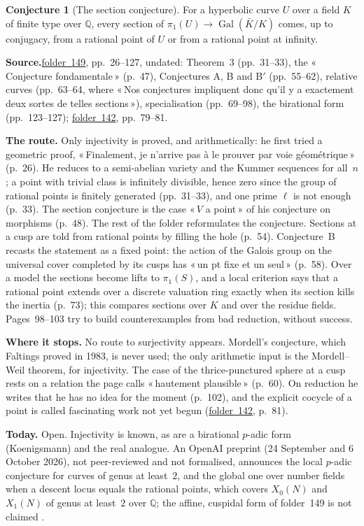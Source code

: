 \documentclass[11pt]{article}
\newcommand{\q}[1]{«\,#1\,»}
\newcommand{\fac}[1]{\href{https://grothendieck.umontpellier.fr/#1.pdf}{folder~#1}}
\newcommand{\Gal}{\operatorname{Gal}}
\theoremstyle{definition}
\theoremstyle{plain}\newtheorem*{proposition}{Proposition}\theoremstyle{definition}
\newtheorem{bigconj}{Conjecture}
\newcommand{\entry}[1]{\par\medskip\noindent\textbf{#1}\enspace}
\newcommand{\src}[1]{\entry{Source.}#1}
\begin{document}
\begin{bigconj}[The section conjecture]\label{c:sec}
For a hyperbolic curve $U$ over a field $K$ of finite type over $\mathbb Q$, every section of $\pi_1(U) \to \Gal(\bar K/K)$ comes, up to conjugacy, from a rational point of $U$ or from a rational point at infinity.
\end{bigconj}

\src{\fac{149}, pp.~26--127, undated: Theorem~3 (pp.~31--33), the \q{Conjecture fondamentale} (p.~47), Conjectures A, B and B$'$ (pp.~55--62), relative curves (pp.~63--64, where \q{Nos conjectures impliquent donc qu'il y a exactement deux sortes de telles sections}), specialisation (pp.~69--98), the birational form (pp.~123--127); \fac{142}, pp.~79--81.}

\entry{The route.} Only injectivity is proved, and arithmetically: he first tried a geometric proof, \q{Finalement, je n'arrive pas à le prouver par voie géométrique} (p.~26). He reduces to a semi-abelian variety and the Kummer sequences for all~$n$; a point with trivial class is infinitely divisible, hence zero since the group of rational points is finitely generated (pp.~31--33), and one prime $\ell$ is not enough (p.~33). The section conjecture is the case \q{$V$ a point} of his conjecture on morphisms (p.~48). The rest of the folder reformulates the conjecture. Sections at a cusp are told from rational points by filling the hole (p.~54). Conjecture~B recasts the statement as a fixed point: the action of the Galois group on the universal cover completed by its cusps has \q{un pt fixe et un seul} (p.~58). Over a model the sections become lifts to $\pi_1(S)$, and a local criterion says that a rational point extends over a discrete valuation ring exactly when its section kills the inertia (p.~73); this compares sections over $K$ and over the residue fields. Pages~98--103 try to build counterexamples from bad reduction, without success.

\entry{Where it stops.} No route to surjectivity appears. Mordell's conjecture, which Faltings proved in 1983, is never used; the only arithmetic input is the Mordell--Weil theorem, for injectivity. The case of the thrice-punctured sphere at a cusp rests on a relation the page calls \q{hautement plausible} (p.~60). On reduction he writes that he has no idea for the moment (p.~102), and the explicit cocycle of a point is called fascinating work not yet begun (\fac{142}, p.~81).

\entry{Today.} Open. Injectivity is known, as are a birational $p$-adic form (Koenigsmann) and the real analogue. An OpenAI preprint (24 September and 6 October 2026), not peer-reviewed and not formalised, announces the local $p$-adic conjecture for curves of genus at least~$2$, and the global one over number fields when a descent locus equals the rational points, which covers $X_0(N)$ and $X_1(N)$ of genus at least~$2$ over $\mathbb Q$; the affine, cuspidal form of folder~149 is not claimed \cite{openaimath}.
\end{document}
